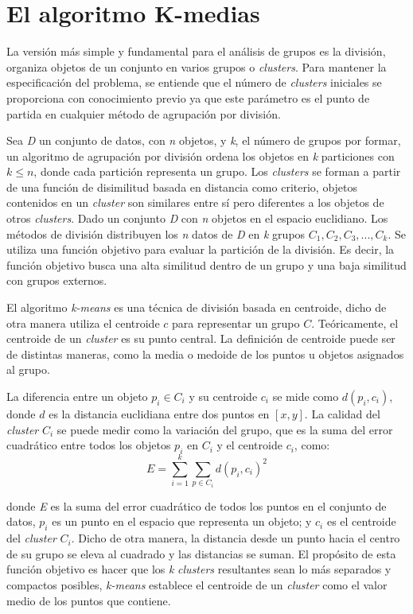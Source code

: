 \section{El algoritmo K-medias} \label{sec:el_algoritmo_K-medias}

La versión más simple y fundamental para el análisis de grupos es la división, organiza objetos de un conjunto en varios grupos o \textit{clusters}. Para mantener la especificación del problema, se entiende que el número de \textit{clusters} iniciales se proporciona con conocimiento previo ya que este parámetro es el punto de partida en cualquier método de agrupación por división.

Sea \textit{D} un conjunto de datos, con \textit{n} objetos, y \textit{k}, el número de grupos por formar, un algoritmo de agrupación por división ordena los objetos en \textit{k} particiones con $k \leq n$, donde cada partición representa un grupo. Los \textit{clusters} se forman a partir de una función de disimilitud basada en distancia como criterio, objetos contenidos en un \textit{cluster} son similares entre sí pero diferentes a los objetos de otros \textit{clusters}. Dado un conjunto \textit{D} con \textit{n} objetos en el espacio euclidiano. Los métodos de división distribuyen los \textit{n} datos de \textit{D} en \textit{k} grupos $C_1, C_2, C_3,..., C_k$. Se utiliza una función objetivo para evaluar la partición de la división. Es decir, la función objetivo busca una alta similitud dentro de un grupo y una baja similitud con grupos externos.

El algoritmo \textit{k-means} es una técnica de división basada en centroide, dicho de otra manera utiliza el centroide $c$ para representar un grupo $C$. Teóricamente, el centroide de un \textit{cluster} es su punto central. La definición de centroide puede ser de distintas maneras, como la media o medoide de los puntos u objetos asignados al grupo.

La diferencia entre un objeto $p_i \in C_i$ y su centroide $c_i$ se mide como $d(p_i, c_i)$, donde $d$ es la distancia euclidiana entre dos puntos en $[x, y]$. La calidad del \textit{cluster} $C_i$ se puede medir como la variación del grupo, que es la suma del error cuadrático entre todos los objetos $p_i$ en $C_i$ y el centroide $c_i$, como:
\begin{equation}
    E = \sum_{i=1}^{k}\sum_{p\in{C_i}}d(p_i, c_i)^2
\end{equation}

donde \textit{E} es la suma del error cuadrático de todos los puntos en el conjunto de datos, $p_i$ es un punto en el espacio que representa un objeto; y $c_i$ es el centroide del \textit{cluster} $C_i$. Dicho de otra manera, la distancia desde un punto hacia el centro de su grupo se eleva al cuadrado y las distancias se suman. El propósito de esta función objetivo es hacer que los \textit{k} \textit{clusters} resultantes sean lo más separados y compactos posibles, \textit{k-means} establece el centroide de un \textit{cluster} como el valor medio de los puntos que contiene. 

